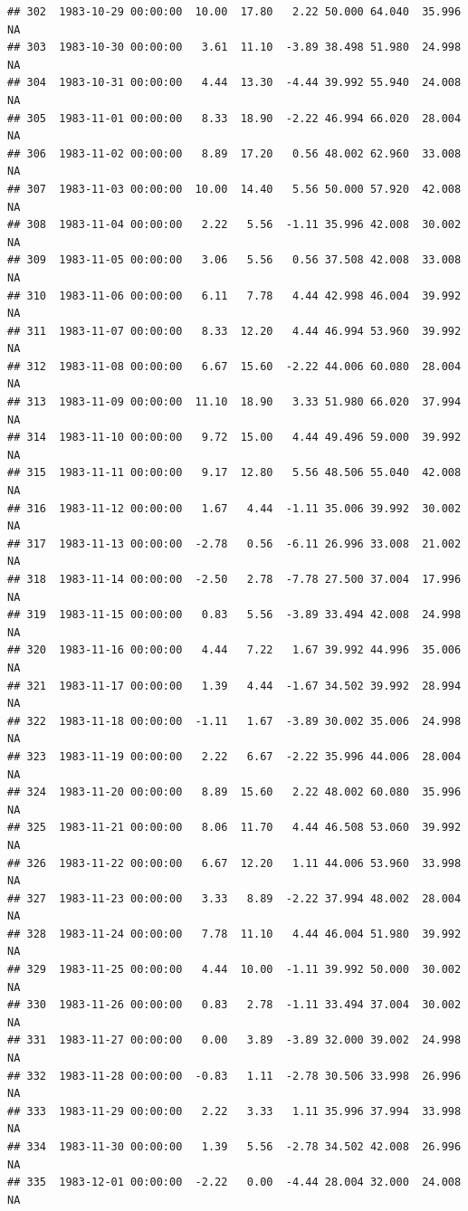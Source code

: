 \documentclass{article}\usepackage{graphicx, color}
\makeatletter
\newenvironment{kframe}{%
 \def\at@end@of@kframe{}%
 \ifinner\ifhmode%
  \def\at@end@of@kframe{\end{minipage}}%
  \begin{minipage}{\columnwidth}%
 \fi\fi%
 \def\FrameCommand##1{\hskip\@totalleftmargin \hskip-\fboxsep
 \colorbox{shadecolor}{##1}\hskip-\fboxsep
     \hskip-\linewidth \hskip-\@totalleftmargin \hskip\columnwidth}%
 \MakeFramed {\advance\hsize-\width
   \@totalleftmargin\z@ \linewidth\hsize
   \@setminipage}}%
 {\par\unskip\endMakeFramed%
 \at@end@of@kframe}
\newenvironment{knitrout}{}{} %
\makeatother
\begin{document}
\begin{knitrout}
\begin{kframe}
\begin{verbatim}
## 302  1983-10-29 00:00:00  10.00  17.80   2.22 50.000 64.040  35.996     NA
## 303  1983-10-30 00:00:00   3.61  11.10  -3.89 38.498 51.980  24.998     NA
## 304  1983-10-31 00:00:00   4.44  13.30  -4.44 39.992 55.940  24.008     NA
## 305  1983-11-01 00:00:00   8.33  18.90  -2.22 46.994 66.020  28.004     NA
## 306  1983-11-02 00:00:00   8.89  17.20   0.56 48.002 62.960  33.008     NA
## 307  1983-11-03 00:00:00  10.00  14.40   5.56 50.000 57.920  42.008     NA
## 308  1983-11-04 00:00:00   2.22   5.56  -1.11 35.996 42.008  30.002     NA
## 309  1983-11-05 00:00:00   3.06   5.56   0.56 37.508 42.008  33.008     NA
## 310  1983-11-06 00:00:00   6.11   7.78   4.44 42.998 46.004  39.992     NA
## 311  1983-11-07 00:00:00   8.33  12.20   4.44 46.994 53.960  39.992     NA
## 312  1983-11-08 00:00:00   6.67  15.60  -2.22 44.006 60.080  28.004     NA
## 313  1983-11-09 00:00:00  11.10  18.90   3.33 51.980 66.020  37.994     NA
## 314  1983-11-10 00:00:00   9.72  15.00   4.44 49.496 59.000  39.992     NA
## 315  1983-11-11 00:00:00   9.17  12.80   5.56 48.506 55.040  42.008     NA
## 316  1983-11-12 00:00:00   1.67   4.44  -1.11 35.006 39.992  30.002     NA
## 317  1983-11-13 00:00:00  -2.78   0.56  -6.11 26.996 33.008  21.002     NA
## 318  1983-11-14 00:00:00  -2.50   2.78  -7.78 27.500 37.004  17.996     NA
## 319  1983-11-15 00:00:00   0.83   5.56  -3.89 33.494 42.008  24.998     NA
## 320  1983-11-16 00:00:00   4.44   7.22   1.67 39.992 44.996  35.006     NA
## 321  1983-11-17 00:00:00   1.39   4.44  -1.67 34.502 39.992  28.994     NA
## 322  1983-11-18 00:00:00  -1.11   1.67  -3.89 30.002 35.006  24.998     NA
## 323  1983-11-19 00:00:00   2.22   6.67  -2.22 35.996 44.006  28.004     NA
## 324  1983-11-20 00:00:00   8.89  15.60   2.22 48.002 60.080  35.996     NA
## 325  1983-11-21 00:00:00   8.06  11.70   4.44 46.508 53.060  39.992     NA
## 326  1983-11-22 00:00:00   6.67  12.20   1.11 44.006 53.960  33.998     NA
## 327  1983-11-23 00:00:00   3.33   8.89  -2.22 37.994 48.002  28.004     NA
## 328  1983-11-24 00:00:00   7.78  11.10   4.44 46.004 51.980  39.992     NA
## 329  1983-11-25 00:00:00   4.44  10.00  -1.11 39.992 50.000  30.002     NA
## 330  1983-11-26 00:00:00   0.83   2.78  -1.11 33.494 37.004  30.002     NA
## 331  1983-11-27 00:00:00   0.00   3.89  -3.89 32.000 39.002  24.998     NA
## 332  1983-11-28 00:00:00  -0.83   1.11  -2.78 30.506 33.998  26.996     NA
## 333  1983-11-29 00:00:00   2.22   3.33   1.11 35.996 37.994  33.998     NA
## 334  1983-11-30 00:00:00   1.39   5.56  -2.78 34.502 42.008  26.996     NA
## 335  1983-12-01 00:00:00  -2.22   0.00  -4.44 28.004 32.000  24.008     NA

\end{verbatim}
\end{kframe}
\end{knitrout}
\end{document}
